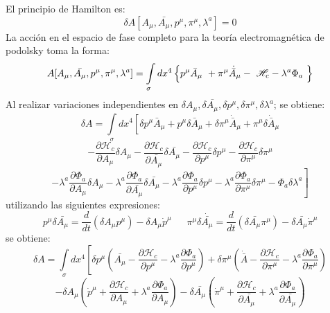 \documentclass[a4paper,12pt]{article}
\begin{document}
El principio de Hamilton es:
\begin{equation}
\delta A[A_\mu,\bar{A_\mu},p^\mu,\pi^\mu,\lambda^a]=0 
\end{equation}
La acción en el espacio de fase completo para la teoría electromagnética de podolsky toma la forma:
\begin{equation}
A[A_\mu,\bar{A_\mu},p^\mu,\pi^\mu,\lambda^a]=\int\limits_{\sigma}dx^4\left\{p^{\mu}\bar{A}_\mu\ +\pi^{\mu}\dot{\bar{ A}}_\mu -\ \mathscr{H}_c-\lambda^a\Phi_a\\ \ \right\} 
\end{equation}
Al realizar variaciones independientes en $\delta A_\mu,\delta \bar{A_\mu},\delta p^\mu,\delta \pi^\mu,\delta \lambda^a$; se obtiene: 
\begin{equation}
\delta A=\int\limits_{\sigma}dx^4\left[\delta p^{\mu}\bar{A}_\mu+ p^{\mu}\delta\bar{A}_\mu+\delta \pi^{\mu}\dot{\bar{ A}}_\mu+\pi^{\mu}\delta\dot{\bar{ A}}_\mu \right. 
\end{equation}
$$\left.-\frac{\partial \mathscr{H}_c}{\partial A_\mu}\delta A_\mu-\frac{\partial \mathscr{H}_c}{\partial \bar{A_\mu}}\delta \bar{A_\mu}-\frac{\partial \mathscr{H}_c}{\partial p^\mu}\delta p^\mu-\frac{\partial \mathscr{H}_c}{\partial \pi^\mu}\delta\pi^\mu\right.$$
$$\left. -\lambda^a\frac{\partial \Phi_a}{\partial A_\mu}\delta A_\mu-\lambda^a\frac{\partial \Phi_a}{\partial \bar{A_\mu}}\delta \bar{A_\mu}-\lambda^a\frac{\partial \Phi_a}{\partial p^\mu}\delta p^\mu-\lambda^a\frac{\partial \Phi_a}{\partial \pi^\mu}\delta\pi^\mu -\Phi_a\delta \lambda^a\right]$$
utilizando las siguientes expresiones:
\begin{equation}
p^{\mu}\delta\bar{A_\mu}=\frac{d}{dt}(\delta A_\mu p^{\mu})-\delta A_\mu\dot p^{\mu}\ \ \ \ \ \  \ \pi^{\mu}\delta\dot{\bar{A_\mu}}=\frac{d}{dt}(\delta\bar{A_\mu}\pi^{\mu})-\delta\bar{A_\mu}\dot\pi^{\mu}
\end{equation}
se obtiene:
\begin{equation}
\delta A=\int\limits_{\sigma}dx^4\left[\delta p^{\mu}\left(\bar{A_\mu}-\frac{\partial \mathscr{H}_c}{\partial p^{\mu}}-\lambda^a\frac{\partial \Phi_a}{\partial p^\mu}\right)+\delta\pi^{\mu}\left(\dot{\bar{A}}-\frac{\partial \mathscr{H}_c}{\partial\pi^{\mu}}-\lambda^a\frac{\partial \Phi_a}{\partial \pi^\mu}\right)\right.
\end{equation}
$$-\delta A_\mu\left(\dot p^{\mu}+\frac{\partial \mathscr{H}_c}{\partial A_\mu}+\lambda^a\frac{\partial \Phi_a}{\partial A_\mu}\right)-\delta\bar{A_\mu}\left(\dot\pi^{\mu}+\frac{\partial \mathscr{H}_c}{\partial\bar{A_\mu}}+\lambda^a\frac{\partial \Phi_a}{\partial \bar{A_\mu}}\right) $$
\end{document}
